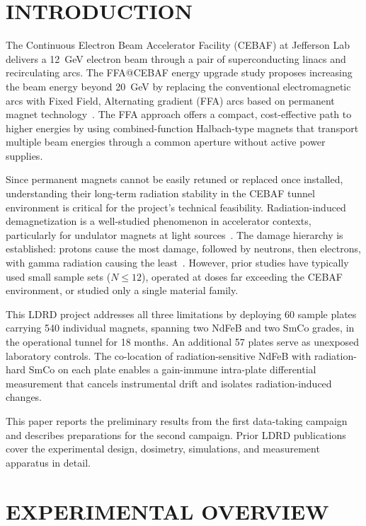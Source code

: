 \documentclass[a4paper,
               ]{jacow}
\begin{document}
\section{INTRODUCTION}

The Continuous Electron Beam Accelerator Facility (CEBAF) at Jefferson Lab delivers a \SI{12}{GeV} electron beam through a pair of superconducting linacs and recirculating arcs. The FFA@CEBAF energy upgrade study proposes increasing the beam energy beyond \SI{20}{GeV} by replacing the conventional electromagnetic arcs with Fixed Field, Alternating gradient (FFA) arcs based on permanent magnet technology~\cite{Khan:ipac2024-mopr08}. The FFA approach offers a compact, cost-effective path to higher energies by using combined-function Halbach-type magnets that transport multiple beam energies through a common aperture without active power supplies.

Since permanent magnets cannot be easily retuned or replaced once installed, understanding their long-term radiation stability in the CEBAF tunnel environment is critical for the project's technical feasibility. Radiation-induced demagnetization is a well-studied phenomenon in accelerator contexts, particularly for undulator magnets at light sources~\cite{Bizen:2016}. The damage hierarchy is established: protons cause the most damage, followed by neutrons, then electrons, with gamma radiation causing the least~\cite{Shepherd:Radiation, Shen:2018}. However, prior studies have typically used small sample sets ($N \leq 12$), operated at doses far exceeding the CEBAF environment, or studied only a single material family.

This LDRD project addresses all three limitations by deploying 60 sample plates carrying 540 individual magnets, spanning two NdFeB and two SmCo grades, in the operational tunnel for 18 months. An additional 57 plates serve as unexposed laboratory controls. The co-location of radiation-sensitive NdFeB with radiation-hard SmCo on each plate enables a gain-immune intra-plate differential measurement that cancels instrumental drift and isolates radiation-induced changes.

This paper reports the preliminary results from the first data-taking campaign and describes preparations for the second campaign. Prior LDRD publications~\cite{Bodenstein:ipac2024-thps58, Bodenstein:ipac2025-thpb093, Bodenstein:napac25-wean02} cover the experimental design, dosimetry, simulations, and measurement apparatus in detail.

\section{EXPERIMENTAL OVERVIEW}
\end{document}
